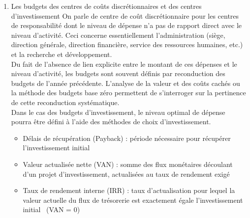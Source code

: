 \documentclass{tufte-handout}
\begin{document}
\begin{enumerate}
\begin{itemize}
\end{itemize}
Diverses méthodes permettent alors d'optimiser ce coût d'approvisionnement\footnote{Par exemple, \href{https://fr.wikipedia.org/wiki/Formule\_de\_Wilson}{la formule de Wilson}\\}.\\
Le programme d'approvisionnement comprend évidence 4 éléments : les commandes, les livraisons, les consommations et le stock (fin de mois).\\
Le budget des coûts d'approvisionnement comprend :\\
\begin{itemize}
\item les coûts d'achat, qui dépendent souvent des quantités achetées et doivent inclure les frais liés aux achats (notamment le transport) ;\\
\item les coûts d'approvisionnement (de passation de commande) et de stockage.\\
\end{itemize}
\item Les budgets des centres de coûts discrétionnaires et des centres d'investissement
\label{sec:org496e59a}
On parle de centre de coût discrétionnaire pour les centres de responsabilité dont le niveau de dépense n'a pas de rapport direct avec le niveau d'activité. Ceci concerne essentiellement l'administration (siège, direction générale, direction financière, service des ressources humaines, etc.) et la recherche et développement.\\
Du fait de l'absence de lien explicite entre le montant de ces dépenses et le niveau d'activité, les budgets sont souvent définis par reconduction des budgets de l'année précédente. L'analyse de la valeur et des coûts cachés ou la méthode des budgets base zéro permettent de s'interroger sur la pertinence de cette reconduction systématique.\\
Dans le cas des budgets d'investissement, le niveau optimal de dépense pourra être défini à l'aide des méthodes de choix d'investissement.\\
\begin{itemize}
\item Délais de récupération (Payback) : période nécessaire pour récupérer l'investissement initial\\
\item Valeur actualisée nette (VAN) : somme des flux monétaires découlant d’un projet d’investissement, actualisées au taux de rendement exigé\\
\item Taux de rendement interne (IRR) : taux d’actualisation  pour lequel la valeur actuelle du flux de trésorerie est exactement égale l'investissement initial  (VAN  = 0)\\
\end{itemize}


\end{enumerate}
\end{document}
